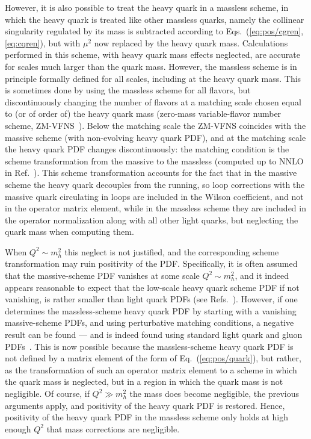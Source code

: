 However, it is also possible to treat the heavy quark in a massless \msbar{}
scheme, in which the heavy quark is treated like other massless
quarks, namely the collinear singularity regulated by its mass is
subtracted  according to Eqs.~(\ref{eq:pos/cgren},\ref{eq:cqren}), but with
$\mu^2$ now replaced by the heavy quark mass. Calculations performed
in this scheme, with heavy quark mass effects neglected, are accurate
for scales much larger than the quark mass.  
However,  the massless scheme is in principle formally defined for all scales,
including at the heavy quark mass. This is sometimes done by using the
massless scheme for all flavors, but discontinuously changing the
number of flavors at a matching scale chosen equal to (or of order of) the
heavy quark mass (zero-mass variable-flavor number scheme,
ZM-VFNS~\cite{Aivazis:1993pi}). Below the matching scale the ZM-VFNS
coincides with the massive scheme (with non-evolving heavy quark PDF),
and at the matching scale the heavy quark PDF
changes discontinuously:  the matching condition is the scheme transformation
from the massive to the massless \msbar{} (computed up to NNLO in
Ref.~\cite{Buza:1996wv}). This scheme transformation accounts for the
fact that in the massive scheme the heavy quark decouples from the
running, so
loop corrections with the massive
quark circulating in loops are included in the Wilson coefficient,
and not in the operator matrix element, while in the massless scheme
they are included in the operator normalization along with all other
light quarks, but neglecting the quark mass when computing them.

When $Q^2\sim m_h^2$ this neglect is not justified, and the corresponding
scheme transformation may ruin positivity of the PDF. Specifically, it
is often assumed that the massive-scheme PDF vanishes at some scale  $Q^2\sim m_h^2$,
and it indeed appears
reasonable to expect that the low-scale heavy quark scheme PDF if not vanishing, is rather smaller than
light quark PDFs (see
Refs.~\cite{Ball:2015dpa,Ball:2016neh}). However, if one determines the 
massless-scheme
heavy quark PDF by starting with a vanishing massive-scheme PDFs, and
using perturbative  matching conditions, a negative result can be found
--- and is 
indeed found using standard light quark and gluon
PDFs~\cite{Ball:2017nwa}. This is now possible because the
massless-scheme heavy quark
PDF is not defined by a matrix element of the form of
Eq.~(\ref{eq:pos/quark}), but rather, as the transformation of such an
operator matrix element to a scheme in which the quark mass is
neglected, but in a region in which the quark mass is not negligible.
Of course, if  $Q^2\gg m_h^2$ the mass does become negligible, the
previous arguments apply, and
positivity of the heavy quark PDF is restored. Hence, positivity of
the heavy quark PDF in the massless scheme only holds at high enough
$Q^2$ that mass corrections are negligible.
 
